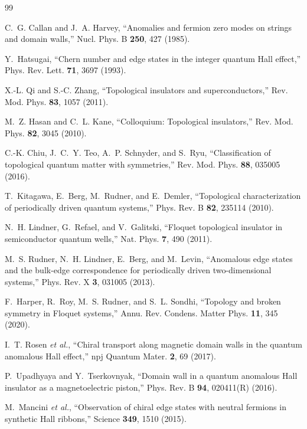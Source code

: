 \documentclass[aps,prl,twocolumn,floatfix,superscriptaddress,nofootinbib]{revtex4-2}
\begin{document}
\begin{thebibliography}{99}

C.~G. Callan and J.~A. Harvey,
``Anomalies and fermion zero modes on strings and domain walls,''
Nucl. Phys. B \textbf{250}, 427 (1985).

Y.~Hatsugai,
``Chern number and edge states in the integer quantum Hall effect,''
Phys. Rev. Lett. \textbf{71}, 3697 (1993).

X.-L. Qi and S.-C. Zhang,
``Topological insulators and superconductors,''
Rev. Mod. Phys. \textbf{83}, 1057 (2011).

M.~Z. Hasan and C.~L. Kane,
``Colloquium: Topological insulators,''
Rev. Mod. Phys. \textbf{82}, 3045 (2010).

C.-K. Chiu, J.~C.~Y. Teo, A.~P. Schnyder, and S.~Ryu,
``Classification of topological quantum matter with symmetries,''
Rev. Mod. Phys. \textbf{88}, 035005 (2016).

T.~Kitagawa, E.~Berg, M.~Rudner, and E.~Demler,
``Topological characterization of periodically driven quantum systems,''
Phys. Rev. B \textbf{82}, 235114 (2010).

N.~H. Lindner, G.~Refael, and V.~Galitski,
``Floquet topological insulator in semiconductor quantum wells,''
Nat. Phys. \textbf{7}, 490 (2011).

M.~S. Rudner, N.~H. Lindner, E.~Berg, and M.~Levin,
``Anomalous edge states and the bulk-edge correspondence for periodically driven two-dimensional systems,''
Phys. Rev. X \textbf{3}, 031005 (2013).

F.~Harper, R.~Roy, M.~S. Rudner, and S.~L. Sondhi,
``Topology and broken symmetry in Floquet systems,''
Annu. Rev. Condens. Matter Phys. \textbf{11}, 345 (2020).

I.~T. Rosen \emph{et al.},
``Chiral transport along magnetic domain walls in the quantum anomalous Hall effect,''
npj Quantum Mater. \textbf{2}, 69 (2017).

P.~Upadhyaya and Y.~Tserkovnyak,
``Domain wall in a quantum anomalous Hall insulator as a magnetoelectric piston,''
Phys. Rev. B \textbf{94}, 020411(R) (2016).

M.~Mancini \emph{et al.},
``Observation of chiral edge states with neutral fermions in synthetic Hall ribbons,''
Science \textbf{349}, 1510 (2015).


\end{thebibliography}
\end{document}
